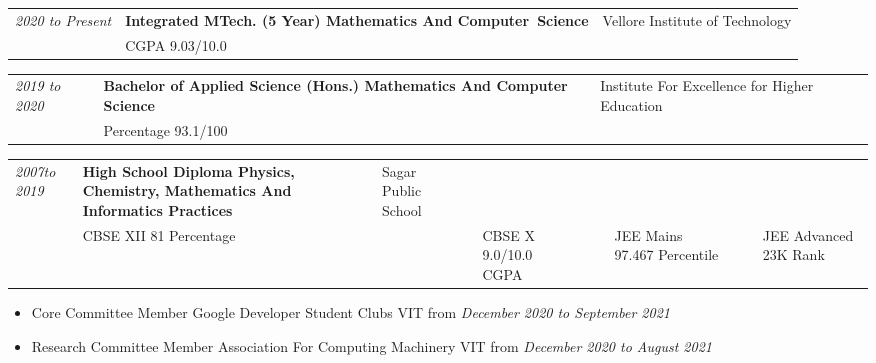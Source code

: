 \documentclass{myresume}
\begin{document}

        \begin{tabularx}{\textwidth}{ >{\hsize=0.25\hsize}X  >{\hsize=0.5\hsize}X >{\hsize=0.25\hsize}X }
                \textit{2020 to Present} & \textbf{Integrated MTech. (5 Year) Mathematics And \mbox{Computer Science} } & {Vellore Institute of {\hspace{1cm}}Technology}\\
                & CGPA 9.03/10.0 & \\
        \end{tabularx}

        \begin{tabularx}{\textwidth}{ >{\hsize=0.25\hsize}X  >{\hsize=0.5\hsize}X >{\hsize=0.25\hsize}X }
            \textit{2019 to 2020} & \textbf{Bachelor of Applied Science (Hons.) {\hspace{1cm}} Mathematics And Computer Science} & Institute For Excellence for Higher Education\\
            & Percentage 93.1/100 & \\
        \end{tabularx} 
        
        \begin{tabularx}{\textwidth}{ >{\hsize}X  >{\hsize}X >{\hsize}X }
            \textit{2007to 2019} & \textbf{High School Diploma Physics, Chemistry, Mathematics And Informatics Practices} & Sagar Public School\\
            & CBSE XII 81 Percentage & & & CBSE X 9.0/10.0 CGPA & & & JEE Mains 97.467 Percentile & & & JEE Advanced 23K Rank & \\ 
        \end{tabularx}
       
       
        \begin{itemize}
                \item Core Committee Member  Google Developer Student Clubs  VIT from \textit{December 2020 to September 2021}
                \item Research Committee Member  Association For Computing Machinery  VIT from \textit{December 2020 to August 2021}
        \end{itemize}
\end{document}
